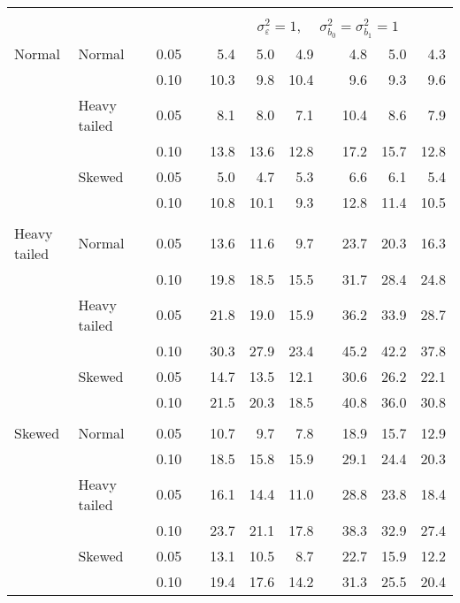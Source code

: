 \begin{table}[ht]
\begin{scriptsize}
\begin{tabular}{ll p{.1cm} c p{.1cm} rrr p{.1cm} rrr}
&&&&&&&&&&&\\
& && && \multicolumn{7}{c}{$\sigma_{\varepsilon}^2 = 1$, \ \ $\sigma_{b_0}^2 = \sigma_{b_1}^2 = 1$} \\ \cline{6-12}
\rowcolor{gray!20} Normal & Normal &  & 0.05 &  & 5.4 & 5.0 & 4.9 &  & 4.8 & 5.0 & 4.3 \\ 
\rowcolor{gray!20}    &  &  & 0.10 &  & 10.3 & 9.8 & 10.4 &  & 9.6 & 9.3 & 9.6 \\ 
\rowcolor{gray!20}    & Heavy tailed &  & 0.05 &  & 8.1 & 8.0 & 7.1 &  & 10.4 & 8.6 & 7.9 \\ 
\rowcolor{gray!20}    &  &  & 0.10 &  & 13.8 & 13.6 & 12.8 &  & 17.2 & 15.7 & 12.8 \\ 
\rowcolor{gray!20}    & Skewed &  & 0.05 &  & 5.0 & 4.7 & 5.3 &  & 6.6 & 6.1 & 5.4 \\ 
\rowcolor{gray!20}    &  &  & 0.10 &  & 10.8 & 10.1 & 9.3 &  & 12.8 & 11.4 & 10.5 \\ 
&&&&&&&&&&&\\
  Heavy tailed & Normal &  & 0.05 &  & 13.6 & 11.6 & 9.7 &  & 23.7 & 20.3 & 16.3 \\ 
   &  &  & 0.10 &  & 19.8 & 18.5 & 15.5 &  & 31.7 & 28.4 & 24.8 \\ 
   & Heavy tailed &  & 0.05 &  & 21.8 & 19.0 & 15.9 &  & 36.2 & 33.9 & 28.7 \\ 
   &  &  & 0.10 &  & 30.3 & 27.9 & 23.4 &  & 45.2 & 42.2 & 37.8 \\ 
   & Skewed &  & 0.05 &  & 14.7 & 13.5 & 12.1 &  & 30.6 & 26.2 & 22.1 \\ 
   &  &  & 0.10 &  & 21.5 & 20.3 & 18.5 &  & 40.8 & 36.0 & 30.8 \\ 
&&&&&&&&&&&\\
  Skewed & Normal &  & 0.05 &  & 10.7 & 9.7 & 7.8 &  & 18.9 & 15.7 & 12.9 \\ 
   &  &  & 0.10 &  & 18.5 & 15.8 & 15.9 &  & 29.1 & 24.4 & 20.3 \\ 
   & Heavy tailed &  & 0.05 &  & 16.1 & 14.4 & 11.0 &  & 28.8 & 23.8 & 18.4 \\ 
   &  &  & 0.10 &  & 23.7 & 21.1 & 17.8 &  & 38.3 & 32.9 & 27.4 \\ 
   & Skewed &  & 0.05 &  & 13.1 & 10.5 & 8.7 &  & 22.7 & 15.9 & 12.2 \\ 
   &  &  & 0.10 &  & 19.4 & 17.6 & 14.2 &  & 31.3 & 25.5 & 20.4 \\ 


\end{tabular}
\end{scriptsize}
\end{table}
